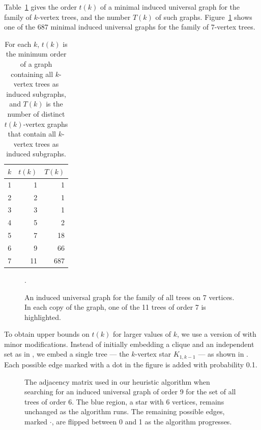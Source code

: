 Table~\ref{tab:treeresults} gives the order $t(k)$ of a minimal induced universal graph for
the family of $k$-vertex trees, and the number $T(k)$ of such graphs.  Figure~\ref{fig:tree-example}
shows one of the 687 minimal induced universal graphs for the family of 7-vertex trees.

\begin{table}[h!]
\centering
\footnotesize
\begin{tabular}{r r r}
 \toprule
 $k$ & $t(k)$ & $T(k)$ \\ [0.5ex]
 \midrule
 1 & 1 & 1 \\
 2 & 2 & 1 \\
 3 & 3 & 1 \\
 4 & 5 & 2 \\
 5 & 7 & 18 \\
 6 & 9 & 66 \\
 7 & 11 & 687 \\
 \bottomrule
\end{tabular}
\caption{For each $k$, $t(k)$ is the minimum order of a graph containing all $k$-vertex trees as
induced subgraphs, and $T(k)$ is the number of distinct $t(k)$-vertex graphs that contain
all $k$-vertex trees as induced subgraphs.}
\label{tab:treeresults}
\end{table}

\begin{figure}[htb]
    \centering
    
\caption{An induced universal graph for the family of all
    trees on 7 vertices.  In each copy of the graph, one of the
    11 trees of order 7 is highlighted.}.
\label{fig:tree-example}
\end{figure}

To obtain upper bounds on $t(k)$ for larger values of $k$, we use a version of
 with minor modifications.  Instead of initially embedding
a clique and an independent set as in , we embed
a single tree --- the $k$-vertex star $K_{1,k-1}$ --- as shown in
.  Each possible edge marked with a dot
in the figure is added with probability 0.1.

\begin{figure}[h!]
    \centering
    \footnotesize
    \caption{The adjacency matrix used in our heuristic algorithm when searching
        for an induced universal graph of order 9 for the set of all trees
        of order 6.  The blue
        region, a star with 6 vertices, remains unchanged as the algorithm runs.
        The remaining possible edges, marked $\boldsymbol{\cdot}$,
        are flipped between 0 and 1 as the algorithm progresses.}
\label{fig:heuristic-regions-for-trees}
\end{figure}

